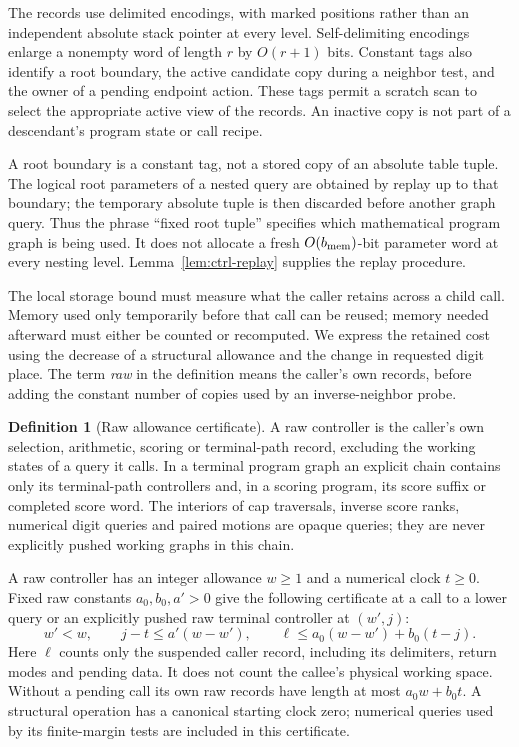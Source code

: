 \documentclass[11pt]{article}
\numberwithin{equation}{section}
\theoremstyle{definition}
\newtheorem{definition}[theorem]{Definition}
\theoremstyle{remark}
\begin{document}
The records use delimited encodings, with marked positions rather than
an independent absolute stack pointer at every level.  Self-delimiting
encodings enlarge a nonempty word of length $r$ by $O(r+1)$ bits.
Constant tags also identify a root boundary, the active candidate copy
during a neighbor test, and the owner of a pending endpoint action.
These tags permit a scratch scan to select the appropriate active view
of the records.  An inactive copy is not part of a descendant's program
state or call recipe.

A root boundary is a constant tag, not a stored copy of an absolute
table tuple.  The logical root parameters of a nested query are obtained
by replay up to that boundary; the temporary absolute tuple is then
discarded before another graph query.  Thus the phrase ``fixed root
tuple'' specifies which mathematical program graph is being used.  It
does not allocate a fresh $O({b_{\rm mem}})$-bit parameter word at every nesting
level.  Lemma~\ref{lem:ctrl-replay} supplies the replay procedure.

The local storage bound must measure what the caller retains across a child call. Memory used only temporarily before that call can be reused; memory needed afterward must either be counted or recomputed. We express the retained cost using the decrease of a structural allowance and the change in requested digit place. The term \emph{raw} in the definition means the caller's own records, before adding the constant number of copies used by an inverse-neighbor probe.

\begin{definition}[Raw allowance certificate]\label{def:ctrl-allowance}
A raw controller is the caller's own selection, arithmetic, scoring or
terminal-path record, excluding the working states of a query it calls.
In a terminal program graph an explicit chain contains only its
terminal-path controllers and, in a scoring program, its score suffix
or completed score word.  The interiors of cap traversals, inverse score
ranks, numerical digit queries and paired motions are opaque queries;
they are never explicitly pushed working graphs in this chain.

A raw controller has an integer allowance $w\ge1$ and a numerical clock
$t\ge0$.  Fixed raw constants $a_0,b_0,a'>0$ give the following
certificate at a call to a lower query or an explicitly pushed raw
terminal controller at $(w',j)$:
\begin{equation}\label{eq:ctrl-local-bound}
 w'<w,\qquad j-t\le a'(w-w'),\qquad
 \ell\le a_0(w-w')+b_0(t-j).
\end{equation}
Here $\ell$ counts only the suspended caller record, including its
delimiters, return modes and pending data.  It does not count the
callee's physical working space.  Without a pending call its own raw
records have length at most $a_0w+b_0t$.  A structural operation has a
canonical starting clock zero; numerical queries used by its
finite-margin tests are included in this certificate.
\end{definition}
\end{document}
